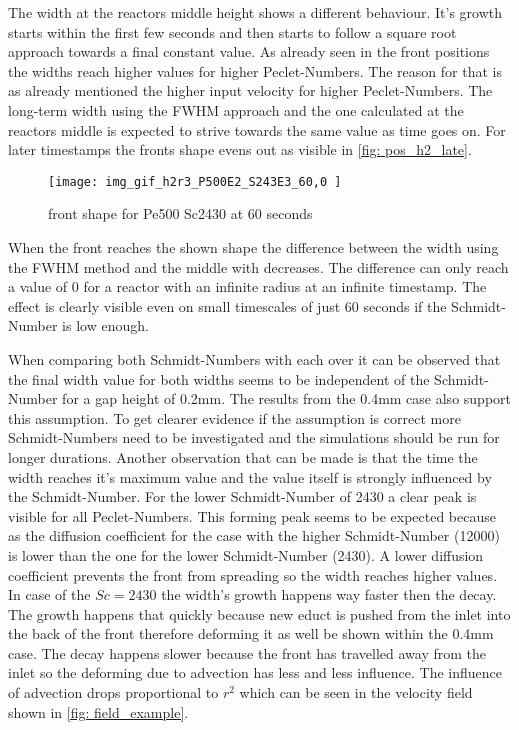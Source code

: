 \documentclass[../thesis.tex]{subfiles}
\begin{document}
The width at the reactors middle height shows a different behaviour. It's growth starts within the first few seconds and then starts to follow a square root approach towards a final constant value. As already seen in the front positions the widths reach higher values for higher Peclet-Numbers. The reason for that is as already mentioned the higher input velocity for higher Peclet-Numbers. The long-term width using the FWHM approach and the one calculated at the reactors middle is expected to strive towards the same value as time goes on. For later timestamps the fronts shape evens out as visible in \autoref{fig: pos_h2_late}.
\begin{figure}[htb]
	\centering
	\texttt{[image: img\_gif\_h2r3\_P500E2\_S243E3\_60,0 ]}
	\caption{front shape for Pe500 Sc2430 at 60 seconds}
	\label{fig: pos_h2_late}
\end{figure}
When the front reaches the shown shape the difference between the width using the FWHM method and the middle with decreases. The difference can only reach a value of 0 for a reactor with an infinite radius at an infinite timestamp. The effect is clearly visible even on small timescales of just 60 seconds if the Schmidt-Number is low enough.

When comparing both Schmidt-Numbers with each over it can be observed that the final width value for both widths seems to be independent of the Schmidt-Number for a gap height of 0.2mm. The results from the 0.4mm case also support this assumption. To get clearer evidence if the assumption is correct more Schmidt-Numbers need to be investigated and the simulations should be run for longer durations.
Another observation that can be made is that the time the width reaches it's maximum value and the value itself is strongly influenced by the Schmidt-Number. For the lower Schmidt-Number of 2430 a clear peak is visible for all Peclet-Numbers. This forming peak seems to be expected because as the diffusion coefficient for the case with the higher Schmidt-Number (12000) is lower than the one for the lower Schmidt-Number (2430). A lower diffusion coefficient prevents the front from spreading so the width reaches higher values. In case of the $Sc = 2430$ the width's growth happens way faster then the decay. The growth happens that quickly because new educt is pushed from the inlet into the back of the front therefore deforming it as well be shown within the 0.4mm case. The decay happens slower because the front has travelled away from the inlet so the deforming due to advection has less and less influence. The influence of advection drops proportional to $r^2$ which can be seen in the velocity field shown in \autoref{fig: field_example}. 
\end{document}
